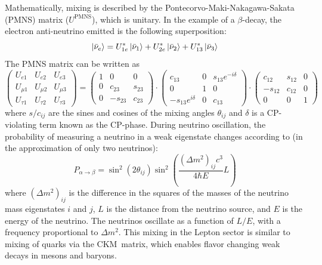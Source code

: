 \documentclass[/main.tex]{subfiles}
\begin{document}
Mathematically, mixing is described by the Pontecorvo-Maki-Nakagawa-Sakata (PMNS) matrix ($U^{\mathrm{PMNS}}$), which is unitary.
In the example of a $\beta$-decay, the electron anti-neutrino emitted is the following superposition:
\begin{equation}
  \ket{\bar\nu_e}=U^*_{1e}\ket{\bar\nu_1}+U^*_{2e}\ket{\bar\nu_2}+U^*_{13}\ket{\bar\nu_3}
\end{equation}
The PMNS matrix can be written as
\begin{equation} \label{eq:PMNS}
  \begin{pmatrix}
    U_{e1} & U_{e2} & U_{e3} \\
    U_{\mu1} & U_{\mu2} & U_{\mu3} \\
    U_{\tau1} & U_{\tau2} & U_{\tau3}
  \end{pmatrix} = \begin{pmatrix}
    1 & 0 & 0 \\
    0 & c_{23} & s_{23} \\
    0 & -s_{23} & c_{23}
  \end{pmatrix} \cdot \begin{pmatrix}
    c_{13} & 0 & s_{13}e^{-i\delta} \\
    0 & 1 & 0 \\
    -s_{13}e^{i\delta} & 0 & c_{13}
  \end{pmatrix} \cdot \begin{pmatrix}
    c_{12} & s_{12} & 0 \\
    -s_{12} & c_{12} & 0 \\
    0 & 0 & 1
  \end{pmatrix}
\end{equation}
where $s/c_{ij}$ are the sines and cosines of the mixing angles $\theta_{ij}$ and $\delta$ is a CP-violating term known as the CP-phase.
During neutrino oscillation, the probability of measuring a neutrino in a weak eigenstate changes according to (in the approximation of only two neutrinos):
\begin{equation}
  P_{\alpha\rightarrow\beta}=\sin^2\left(2\theta_{ij}\right)\sin^2\left(\frac{(\Delta m^2)_{ij}c^3}{4\hbar E}L\right)
\end{equation}
where $(\Delta m^2)_{ij}$ is the difference in the squares of the masses of the neutrino mass eigenstates $i$ and $j$, $L$ is the distance from the neutrino source, and $E$ is the energy of the neutrino.
The neutrinos oscillate as a function of $L/E$, with a frequency proportional to $\Delta m^2$.
This mixing in the Lepton sector is similar to mixing of quarks via the CKM~matrix, which enables flavor changing weak decays in mesons and baryons.
\end{document}
